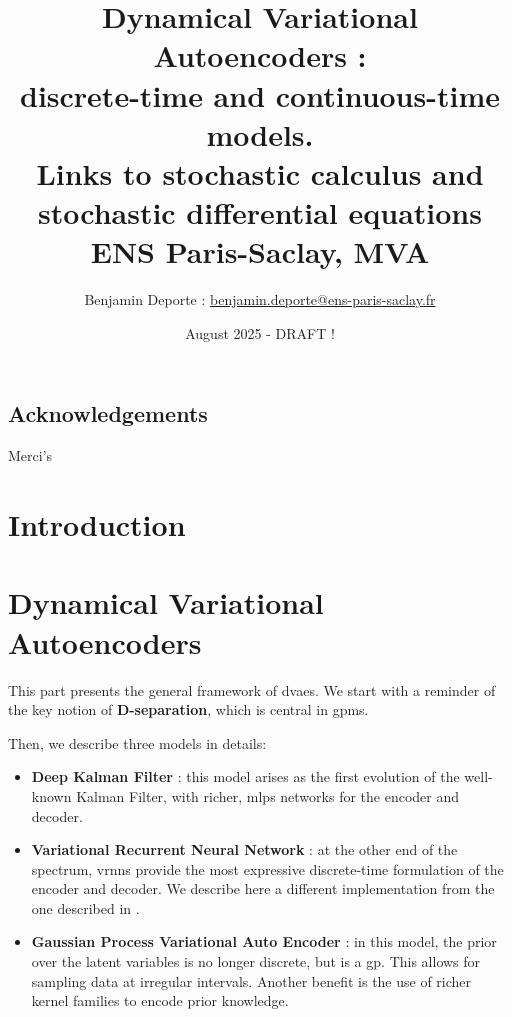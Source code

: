 \documentclass[twoside,11pt]{report}
\title{Dynamical Variational Autoencoders :\\ discrete-time and continuous-time models.\\ Links to stochastic calculus and stochastic differential equations\\
\vspace{2cm}
{\Large{ENS Paris-Saclay, MVA}}}
\author{
Benjamin Deporte : \href{mailto:benjamin.deporte@ens-paris-saclay.fr}{benjamin.deporte@ens-paris-saclay.fr}%
}
\date{August 2025 - DRAFT !}
\begin{document}
\everymath{\displaystyle}
\maketitle

\chapter*{Acknowledgements}

Merci's

\newpage
\singlespacing
\tableofcontents

\newpage
\listoffigures

\part{Introduction}
    
    

%
%
%
%
\part{Dynamical Variational Autoencoders}

This part presents the general framework of \glspl{dvae}. We start with a reminder of the key notion of \textbf{D-separation}, which is central in \glspl{gpm}.

Then, we describe three models in details:
\begin{itemize}
    \item \textbf{Deep Kalman Filter} : this model arises as the first evolution of the well-known Kalman Filter, with richer, \glspl{mlp} networks for the encoder and decoder.
    \item \textbf{Variational Recurrent Neural Network} : at the other end of the spectrum, \glspl{vrnn} provide the most expressive discrete-time formulation of the encoder and decoder.
We describe here a different implementation from the one described in \cite{girin_dynamical_2022}.
    \item \textbf{Gaussian Process Variational Auto Encoder} : in this model, the prior over the latent variables is no longer discrete, but is a \gls{gp}.
This allows for sampling data at irregular intervals. Another benefit is the use of richer kernel families to encode prior knowledge.
\end{itemize}
\end{document}
